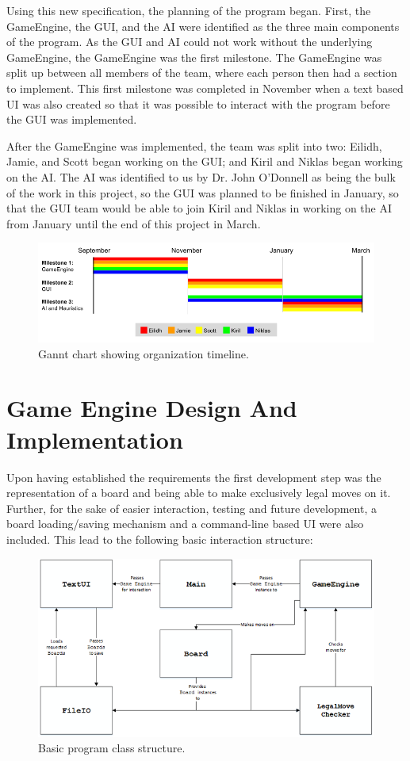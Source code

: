 \documentclass{l3proj}
\begin{document}
Using this new specification, the planning of the program began.  First, the GameEngine, the GUI, and the AI were identified as the three main components of the program.  As the GUI and AI could not work without the underlying GameEngine, the GameEngine was the first milestone.  The GameEngine was split up between all members of the team, where each person then had a section to implement.  This first milestone was completed in November when a text based UI was also created so that it was possible to interact with the program before the GUI was implemented.

After the GameEngine was implemented, the team was split into two: Eilidh, Jamie, and Scott began working on the GUI; and Kiril and Niklas began working on the AI.  The AI was identified to us by Dr. John O’Donnell as being the bulk of the work in this project, so the GUI was planned to be finished in January, so that the GUI team would be able to join Kiril and Niklas in working on the AI from January until the end of this project in March.

\begin{figure}[H]
\centering
\includegraphics[scale=0.5]{Images/GanntChart.png}
\caption{Gannt chart showing organization timeline.}
\end{figure}

\section{Game Engine Design And Implementation}

Upon having established the requirements the first development step was the representation of a board and being able to make exclusively legal moves on it. Further, for the sake of easier interaction, testing and future development, a board loading/saving mechanism and a command-line based UI were also included. This lead to the following basic interaction structure:

\begin{figure}[H]
\centering
\includegraphics[scale=1]{Images/S33Diagram.png}
\caption{Basic program class structure.}
\end{figure}
\end{document}
